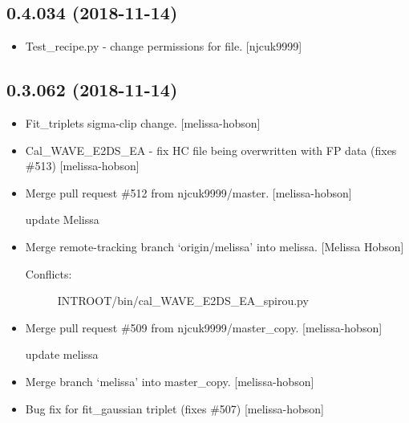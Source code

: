 \documentclass[a4paper,10pt,english]{report}
\begin{document}
\subsection{0.4.034 (2018-11-14)}
\label{\detokenize{misc/changelog:id259}}\begin{itemize}
\item {} 
Test\_recipe.py - change permissions for file. {[}njcuk9999{]}

\end{itemize}


\subsection{0.3.062 (2018-11-14)}
\label{\detokenize{misc/changelog:id260}}\begin{itemize}
\item {} 
Fit\_triplets sigma-clip change. {[}melissa-hobson{]}

\item {} 
Cal\_WAVE\_E2DS\_EA - fix HC file being overwritten with FP data (fixes
\#513) {[}melissa-hobson{]}

\item {} 
Merge pull request \#512 from njcuk9999/master. {[}melissa-hobson{]}

update Melissa

\item {} 
Merge remote-tracking branch ‘origin/melissa’ into melissa. {[}Melissa
Hobson{]}
\begin{description}
\item[{Conflicts:}] \leavevmode
INTROOT/bin/cal\_WAVE\_E2DS\_EA\_spirou.py

\end{description}

\item {} 
Merge pull request \#509 from njcuk9999/master\_copy. {[}melissa-hobson{]}

update melissa

\item {} 
Merge branch ‘melissa’ into master\_copy. {[}melissa-hobson{]}

\item {} 
Bug fix for fit\_gaussian triplet (fixes \#507) {[}melissa-hobson{]}

\end{itemize}
\end{document}
